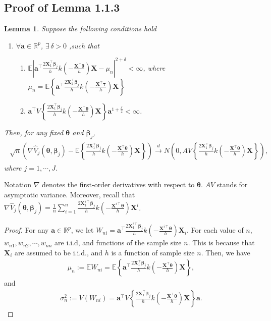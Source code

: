 \documentclass{article}
\newcommand{\wh}{\widehat}
\newcommand{\itl}{\intercal}
\newcommand{\bs}{ \boldsymbol}
\newcommand{\mb}{\mathbb}
\newcommand{\lt}{\left}
\newcommand{\rt}{\right}
\newtheorem{lemma}[theorem]{Lemma}
\begin{document}
\begin{appendices}
\section{Proof of Lemma 1.1.3}
\begin{lemma}
	Suppose the following conditions hold 
	\begin{enumerate}
		\item $\forall \bs{a} \in \mathbb{R}^p$, $\exists \,\delta > 0$ ,such that 
		\begin{enumerate}
			\item $\mathbb{E}\lt|\bs{a}^{\itl}\frac{2\bs{X}_{1}^{\itl}\bs{\beta}_j}{h}k\lt(-\frac{\bs{X}^{\itl}\bs{\theta}}{h}\rt)\bs{X}-\mu_{n}\rt|^{2+\delta} < \infty$, where $\mu_{n}=\mathbb{E}\lt\{\bs{a^{\itl}}\frac{2\bs{X}_{1}^{\itl}\bs{\beta}_{j}}{h}k\lt(-\frac{\bs{X}^{\itl}\bs{\tau}}{h}\rt)\bs{X}\rt\}$
			\item $\bs{\bs{a}^{\itl}}V\lt\{\frac{2\bs{X}^{\itl}_{1}\bs{\beta}_j}{h}k(-\frac{\bs{X}^{\itl}\bs{\theta}}{h})\bs{X}\rt\}\bs{a} ^{1+\frac{\delta}{2}}< \infty$.
		\end{enumerate}
	\end{enumerate} 
	Then, for any fixed $\bs{\theta}$ and $\bs{\beta}_j$,
	\begin{gather}
	\begin{flalign*}
	\sqrt{n}\lt(\nabla\wh{V}_j\lt(\bs{\theta}, \bs{\beta}_j\rt) -  \mb{E} \lt\{\frac{2\bs{X}_{1}^{\itl}\bs{\beta}_{j}}{h}k\lt(-\frac{\bs{X}^{\itl}\bs{\theta}}{h}\rt)\bs{X}\rt\}\rt)\overset{d}{\to}N\lt(0,AV\lt\{\frac{2\bs{X}_1^{\itl}\bs{\beta}_j}{h}k\lt(-\frac{\bs{X}^{\itl}\bs{\theta}}{h}\rt)\bs{X}\rt\}\rt),
	\end{flalign*}
	\end{gather}
	where $j = 1, \cdots, J$.
\end{lemma}
Notation $\nabla$ denotes the first-order derivatives with respect to $\bs{\theta}$. $AV$ stands for asymptotic variance. Moreover, recall that $\nabla\wh{V}_j\lt(\bs{\theta}, \bs{\beta}_j\rt)=\frac{1}{n}\sum_{i=1}^{n}\frac{2\bs{X}_{1}^{i\itl}\bs{\beta}_{j}}{h}k\lt(-\frac{\bs{X}^{i\itl}\bs{\theta}}{h}\rt)\bs{X}^{i}$.
\begin{proof}
	For any  $\bs{a} \in \mathbb{R}^p$, we let $W_{ni}=\bs{a^{\intercal}}\frac{2\bs{X}_{1}^{i\intercal}\bs{\beta}_j}{h}k\lt(-\frac{\bs{X}^{i\intercal}\bs{\theta}}{h}\rt)\bs{X}_{i}$. For each value of $n$, $w_{n1},w_{n2},\cdots,w_{nn}$ are i.i.d, and functions of the sample size $n$. This is because that $\bs{X}_{i}$ are assumed to be i.i.d., and $h$ is a function of sample
	size $n$. Then, we have
	\begin{gather*}
	\mu_{n}:=\mathbb{E}W_{ni}=\mathbb{E}\lt\{\bs{a^{\intercal}}\frac{2\bs{X}_{1}^{\intercal}\bs{\beta}_j}{h}k\lt(-\frac{\bs{X}^{\intercal}\bs{\theta}}{h}\rt)\bs{X}\rt\},
	\end{gather*}
	and 
	\begin{gather*}
	\sigma_{n}^{2}:=V(W_{ni})=\bs{\bs{a}^{\intercal}}V\lt\{\frac{2\bs{X}_{1}^{\intercal}\bs{\beta}_j}{h}k\lt(-\frac{\bs{X}^{\intercal}\bs{\theta}}{h}\rt)\bs{X}\rt\}\bs{a}.
	\end{gather*}
	

\end{proof}
\end{appendices}
\end{document}
